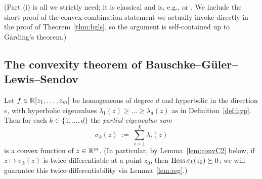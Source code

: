 \noindent (Part (i) is all we strictly need; it is classical and is, e.g.,
\cite[\S2]{BGLS} or \cite{Garding}. We include the short proof of the convex
combination statement we actually invoke directly in the proof of
Theorem~\ref{thm:bgls}, so the argument is self-contained up to G\aa rding's
theorem.)

\subsection*{The convexity theorem of Bauschke--G\"uler--Lewis--Sendov}

\begin{qfourtheorem}\label{thm:bgls}
Let $f\in\mathbb{R}[z_1,\dots,z_m]$ be homogeneous of degree $d$ and hyperbolic in
the direction $e$, with hyperbolic eigenvalues
$\lambda_1(z)\ge\dots\ge\lambda_d(z)$ as in Definition~\ref{def:hyp}. Then for
each $k\in\{1,\dots,d\}$ the \emph{partial eigenvalue sum}
\[
\sigma_k(z)\;:=\;\sum_{i=1}^k\lambda_i(z)
\]
is a convex function of $z\in\mathbb{R}^m$. (In particular, by Lemma~\ref{lem:convC2}
below, if $z\mapsto\sigma_k(z)$ is twice differentiable at a point $z_0$, then
$\operatorname{Hess}\sigma_k(z_0)\succeq 0$; we will guarantee this twice-differentiability
via Lemma~\ref{lem:reg}.)
\end{qfourtheorem}

